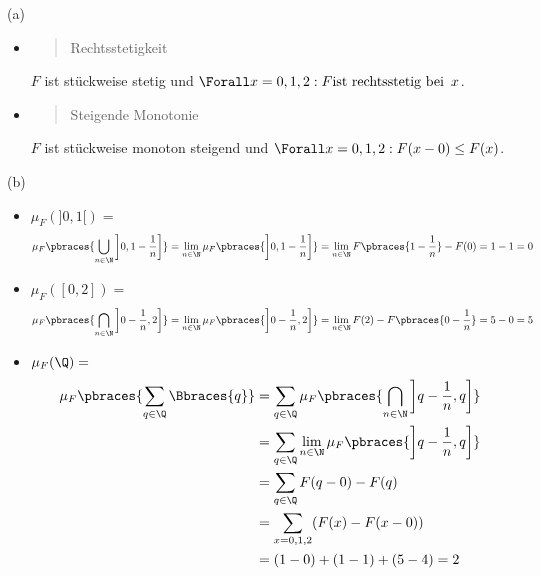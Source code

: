 \begin{solution}

(a)

\begin{itemize}

  \item \blockquote{Rechtsstetigkeit}: $F$ ist stückweise stetig und $\Forall x = 0, 1, 2: F \text{ist rechtsstetig bei} \enspace x$.

  \item \blockquote{Steigende Monotonie}: $F$ ist stückweise monoton steigend und $\Forall x = 0, 1, 2: F(x - 0) \leq F(x)$.

\end{itemize}

(b)

\begin{itemize}

  \item $\mu_F(]0, 1[) =$
  \begin{align*}
    \mu_F \pbraces{\bigcup_{n \in \N} \left ] 0, 1 - \frac{1}{n} \right ]}
    =
    \lim_{n \in \N} \mu_F \pbraces{\left ] 0, 1 - \frac{1}{n} \right ]}
    =
    \lim_{n \in \N} F \pbraces{1 - \frac{1}{n}} - F(0)
    = 1 - 1 = 0
  \end{align*}

  \item $\mu_F([0, 2]) =$
  \begin{align*}
    \mu_F \pbraces{\bigcap_{n \in \N} \left ] 0 - \frac{1}{n}, 2 \right ]}
    =
    \lim_{n \in \N} \mu_F \pbraces{\left ] 0 - \frac{1}{n}, 2 \right ]}
    =
    \lim_{n \in \N} F(2) - F \pbraces{0 - \frac{1}{n}}
    =
    5 - 0 = 5
  \end{align*}

  \item $\mu_F(\Q) =$
  \begin{align*}
    \mu_F \pbraces{\sum_{q \in \Q} \Bbraces{q}}
    & =
    \sum_{q \in \Q} \mu_F \pbraces
    {\bigcap_{n \in \N} \left ] q - \frac{1}{n}, q \right ]} \\
    & =
    \sum_{q \in \Q} \lim_{n \in \N} \mu_F \pbraces
    {\left ] q - \frac{1}{n}, q \right ]} \\
    & =
    \sum_{q \in \Q} F(q - 0) - F(q) \\
    & =
    \sum_{x = 0, 1, 2} (F(x) - F(x - 0)) \\
    & =
    (1 - 0) + (1 - 1) + (5 - 4) = 2
  \end{align*}

\end{itemize}


\end{solution}
